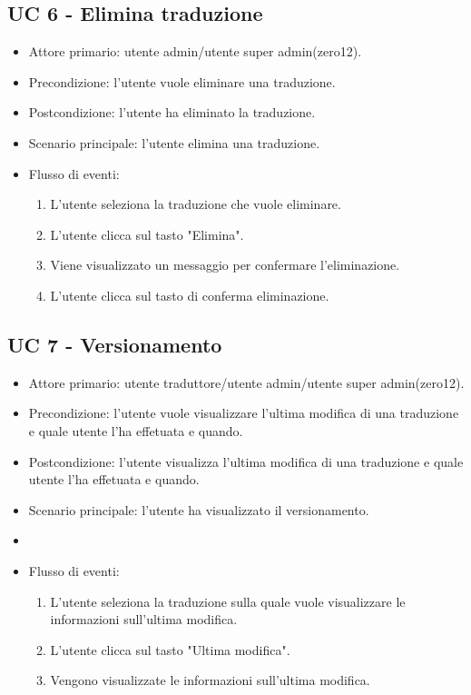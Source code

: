 \subsection{UC 6 - Elimina traduzione}
    \begin{itemize}
        \item Attore primario: utente admin/utente super admin(zero12).
        \item Precondizione: l'utente vuole eliminare una traduzione.
        \item Postcondizione: l'utente ha eliminato la traduzione.
        \item Scenario principale: l'utente elimina una traduzione.
        \item Flusso di eventi:
            \begin{enumerate}
                \item L'utente seleziona la traduzione che vuole eliminare.
                \item L'utente clicca sul tasto "Elimina".
                \item Viene visualizzato un messaggio per confermare l'eliminazione.
                \item L'utente clicca sul tasto di conferma eliminazione.
            \end{enumerate}
    \end{itemize}
\subsection{UC 7 - Versionamento}
    \begin{itemize}
        \item Attore primario: utente traduttore/utente admin/utente super admin(zero12).
        \item Precondizione: l'utente vuole visualizzare l'ultima modifica di una traduzione e quale utente l'ha effetuata e quando.
        \item Postcondizione: l'utente visualizza l'ultima modifica di una traduzione e quale utente l'ha effetuata e quando.
        \item Scenario principale: l'utente ha visualizzato il versionamento.
        \item \item Flusso di eventi:
        \begin{enumerate}
            \item L'utente seleziona la traduzione sulla quale vuole visualizzare le informazioni sull'ultima modifica.
            \item L'utente clicca sul tasto "Ultima modifica".
            \item Vengono visualizzate le informazioni sull'ultima modifica.
        \end{enumerate}
    \end{itemize}   
